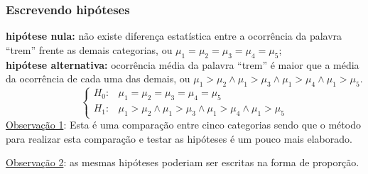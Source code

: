 \documentclass[graphics,14pt]{beamer}
\begin{document}
\begin{frame}[t,fragile=singleslide]
\frametitle{Escrevendo hipóteses}

\textbf{hipótese nula:} não existe diferença estatística entre a ocorrência da palavra ``trem'' frente as demais categorias, ou $\mu_1 = \mu_2 = \mu_3 = \mu_4 = \mu_5$; \\

\textbf{hipótese alternativa:} ocorrência média da palavra ``trem'' é maior que a média da ocorrência de cada uma das demais, ou $\mu_1 > \mu_2 \wedge \mu_1 > \mu_3 \wedge \mu_1 > \mu_4 \wedge \mu_1 > \mu_5$.
\vspace{1cm}
\begin{equation*}
\left\{ \begin{array}{cl}
H_0: & \mu_1 = \mu_2 = \mu_3 = \mu_4 = \mu_5 \\
H_1: & \mu_1 > \mu_2 \wedge \mu_1 > \mu_3 \wedge \mu_1 > \mu_4 \wedge \mu_1 > \mu_5
\end{array}\right.
\end{equation*}
\linebreak
\ul{Observação 1}: Esta é uma comparação entre cinco categorias sendo que o método para realizar esta comparação e testar as hipóteses é um pouco mais elaborado.

\ul{Observação 2}: as mesmas hipóteses poderiam ser escritas na forma de proporção.
\end{frame}
\end{document}
